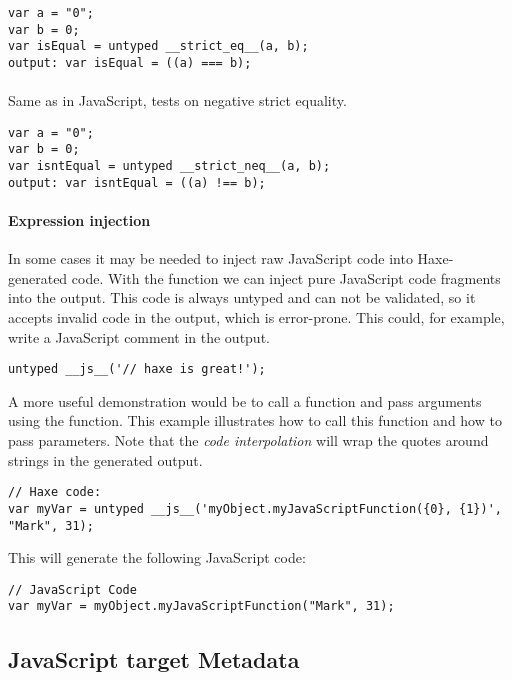 \begin{lstlisting}
var a = "0";
var b = 0;
var isEqual = untyped __strict_eq__(a, b);
output: var isEqual = ((a) === b);
\end{lstlisting}

\paragraph{}
Same as   in JavaScript, tests on negative strict equality.

\begin{lstlisting}
var a = "0";
var b = 0;
var isntEqual = untyped __strict_neq__(a, b);
output: var isntEqual = ((a) !== b);
\end{lstlisting}

\paragraph{Expression injection}

In some cases it may be needed to inject raw JavaScript code into Haxe-generated code. With the  function we can inject pure JavaScript code fragments into the output. This code is always untyped and can not be validated, so it accepts invalid code in the output, which is error-prone.
This could, for example, write a JavaScript comment in the output.

\begin{lstlisting}
untyped __js__('// haxe is great!');
\end{lstlisting}

A more useful demonstration would be to call a function and pass  arguments using the  function. This example illustrates how to call this function and how to pass parameters. Note that the \emph{code interpolation} will wrap the quotes around strings in the generated output.

\begin{lstlisting}
// Haxe code:
var myVar = untyped __js__('myObject.myJavaScriptFunction({0}, {1})', "Mark", 31);
\end{lstlisting}

This will generate the following JavaScript code:
\begin{lstlisting}
// JavaScript Code
var myVar = myObject.myJavaScriptFunction("Mark", 31);
\end{lstlisting}


\subsection{JavaScript target Metadata}
\label{target-javascript-metadata}

